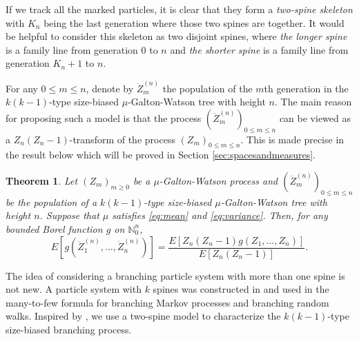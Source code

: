 \documentclass[12pt,a4paper]{amsart}
\newtheorem{thm}{Theorem}[section]
\numberwithin{equation}{section}
\begin{document}
	If we track all the marked particles, it is clear that they form a \emph{two-spine skeleton} with $K_n$ being the last generation where those two spines are together.
	It would be helpful to consider this skeleton as two disjoint spines,
	where \emph{the longer spine} is a family line from generation $0$ to $n$ and \emph{the shorter spine} is a family line from generation $K_n+1$ to $n$.
	
	For any $0\le m \le n$, denote by $\ddot Z_m^{(n)}$ the population of the $m$th generation in the $k(k-1)$-type size-biased $\mu$-Galton-Watson tree with height $n$.
	The main reason for proposing such a model is that the process $(\ddot Z_m^{(n)})_{0\le m\le n}$ can be viewed as
    a $Z_n(Z_n-1)$-transform of the process $(Z_m)_{0\le m\le n}$.
	This is made precise in the result below which will be proved in Section \ref{sec:spacesandmeasures}.
\begin{thm}
\label{thm: change of measure}
	Let $(Z_m)_{m\ge 0}$ be a $\mu$-Galton-Watson process and $(\ddot Z_m^{(n)})_{0\le m\le n}$ be the population of a $k(k-1)$-type size-biased $\mu$-Galton-Watson tree with height $n$.
	Suppose that $\mu$ satisfies \eqref{eq:mean} and \eqref{eq:variance}.
	Then, for any bounded Borel function $g$ on $\mathbb N^{n}_0$,
\[
		E[ g ( \ddot Z_1^{(n)}, \dots, \ddot Z_n^{(n)})]
	=
		\frac{ E[ Z_n(Z_n-1) g( Z_1, \dots, Z_n)]} {E [ Z_n ( Z_n - 1)]}.		
\]
\end{thm}

	The idea of considering a branching particle system with more than one spine is not new.
	A particle system with $k$ spines  was constructed in \cite{harris2015many} and used in the  many-to-few formula for branching Markov processes and branching random walks.
	Inspired by \cite{harris2015many}, we use a two-spine model to characterize the $k(k-1)$-type size-biased branching process.
\end{document}
